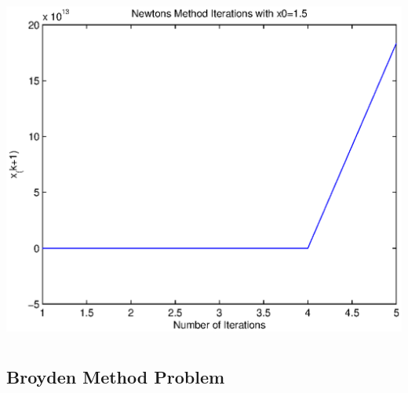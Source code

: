 \documentclass[11pt]{amsart}
\begin{document}
\includegraphics[height=4.5in]{newton2.eps}

\subsection*{Broyden Method Problem}
\end{document}
